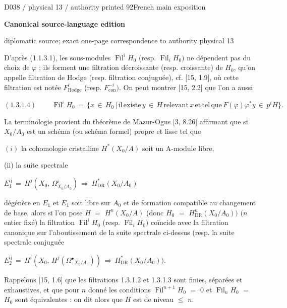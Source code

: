 \documentclass[9pt]{article}
\newcommand{\CanonText}[1]{\par{\fontsize{8.0}{9.35}\selectfont\RaggedRight #1\par}\vspace{2.2pt}}
\newcommand{\CanonDisplay}[1]{\par\vspace{1.2pt}\begin{center}{\fontsize{7.2}{8.4}\selectfont\(\displaystyle #1\)}\end{center}\vspace{1.2pt}}
\newcommand{\LayerTitle}{Canonical source-language edition}
\begin{document}
\noindent\begin{minipage}[t][\dimexpr\textheight-5pt\relax][t]{\textwidth}
{\sffamily\fontsize{7.3}{8.2}\selectfont\color{Quiet} D038 / physical 13 / authority printed 92\hfill French main exposition}
\par{}\vspace{4.5pt}
{\sffamily\fontsize{10.4}{11.6}\selectfont\bfseries\color{Accent} \LayerTitle}
\par{\sffamily\fontsize{6.7}{7.7}\selectfont\color{Quiet} diplomatic source; exact one-page correspondence to authority physical 13}
\vspace{5pt}
\CanonText{D'après (1.1.3.1), les sous-modules \(\operatorname{Fil}^{i}H_{0}\) (resp. \(\operatorname{Fil}_{i}H_{0})\) ne dépendent pas du choix de \(\varphi{}\) ; ils forment une filtration décroissante (resp. croissante) de \(H_{0}\), qu'on appelle filtration de Hodge (resp. filtration conjuguée), cf. [15, 1.9], où cette filtration est notée \(F^{i}_{\mathrm{Hodge}}\) (resp. \(F^{-i}_{\mathrm{con}})\). On peut montrer [15, 2.2] que l'on a aussi}
\CanonDisplay{(1.3.1.4)\qquad\,\operatorname{Fil}^{i}H_{0}\,=\,\lbrace{}x\,\in{}\,H_{0}\,|\,\text{il}\,\text{existe}\,y\,\in{}\,H\,\text{relevant}\,x\,\mathrm{et}\,\text{tel}\,\text{que}\,F(\varphi{})\varphi{}^{*}y\,\in{}\,p^{i}H\rbrace{}.}
\CanonText{La terminologie provient du théorème de Mazur-Ogus [3, 8.26] affirmant que si \(X_{0}/A_{0}\) est un schéma (ou schéma formel) propre et lisse tel que}
\CanonText{\((i)\) la cohomologie cristalline \(H^{*}(X_{0}/A)\) soit un A-module libre,}
\CanonText{(ii) la suite spectrale}
\CanonDisplay{E_{1}^{\mathrm{ij}}\,=\,H^{j}(X_{0},\,\Omega{}^{i}_{X_{0}/A_{0}})\,\Rightarrow{}\,H^{*}_{\mathrm{DR}}(X_{0}/A_{0})}
\CanonText{dégénère en \(E_{1}\) et \(E_{1}\) soit libre sur \(A_{0}\) et de formation compatible au changement de base, alors si l'on pose \(H\) \(=\) \(H^{n}(X_{0}/A)\) (donc \(H_{0}\) \(=\) \(H^{n}_{\mathrm{DR}}(X_{0}/A_{0}))\) \((n\) entier fixé) la filtration \(\operatorname{Fil}^{i}H_{0}\) (resp. \(\operatorname{Fil}_{i}H_{0})\) coïncide avec la filtration canonique sur l'aboutissement de la suite spectrale ci-dessus (resp. la suite spectrale conjuguée}
\CanonDisplay{E_{2}^{\mathrm{ij}}\,=\,H^{i}(X_{0},\,H^{j}(\Omega{}^\bullet{}_{X_{0}/A_{0}}))\,\Rightarrow{}\,H^{*}_{\mathrm{DR}}(X_{0}/A_{0})).}
\CanonText{Rappelons [15, 1.6] que les filtrations 1.3.1.2 et 1.3.1.3 sont finies, séparées et exhaustives, et que pour \(n\) donné les conditions \(\operatorname{Fil}^{n+1}H_{0}\) \(=\) 0 et \(\operatorname{Fil}_{n}H_{0}\) \(=\) \(H_{0}\) sont équivalentes : on dit alors que \(H\) est de niveau \(\leq{}\) \(n\).}

\end{minipage}
\end{document}
